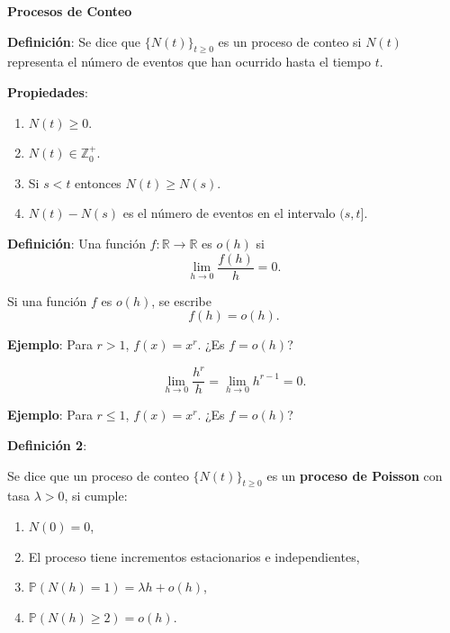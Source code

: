 \documentclass[12pt]{article}
\begin{document}
\textbf{Procesos de Conteo}

\textbf{Definición}: Se dice que $\{N(t)\}_{t \geq 0}$ es un proceso de conteo si $N(t)$ representa el número de eventos que han ocurrido hasta el tiempo $t$.

\textbf{Propiedades}:

\begin{enumerate}
    \item $N(t) \geq 0$.
    \item $N(t) \in \mathbb{Z}_{0}^{+}$.
    \item Si $s < t$ entonces $N(t) \geq N(s)$.
    \item $N(t) - N(s)$ es el número de eventos en el intervalo $(s,t]$.
\end{enumerate}

\textbf{Definición}: Una función $f : \mathbb{R} \to \mathbb{R}$ es $o(h)$ si 
\begin{equation*}
\lim_{h \to 0} \frac{f(h)}{h} = 0.
\end{equation*}

Si una función $f$ es $o(h)$, se escribe
\begin{equation*}
f(h) = o(h).
\end{equation*}

\textbf{Ejemplo}: Para $r > 1$, $f(x) = x^r$.  
¿Es $f = o(h)$?

\begin{equation*}
\lim_{h \to 0} \frac{h^r}{h} = \lim_{h \to 0} h^{r-1} = 0.
\end{equation*}

\begin{center}
\end{center}

\textbf{Ejemplo}: Para $r \leq 1$, $f(x) = x^r$.  
¿Es $f = o(h)$?

\textbf{Definición 2}:

Se dice que un proceso de conteo $\{N(t)\}_{t \geq 0}$ es un \textbf{proceso de Poisson} con tasa $\lambda > 0$, si cumple:

\begin{enumerate}
    \item $N(0) = 0$,
    \item El proceso tiene incrementos estacionarios e independientes,
    \item $\mathbb{P}(N(h) = 1) = \lambda h + o(h)$,
    \item $\mathbb{P}(N(h) \geq 2) = o(h)$.
\end{enumerate}
\end{document}
